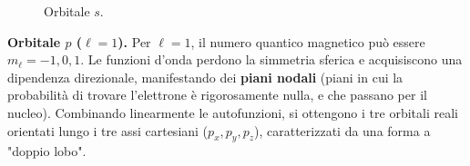 \begin{figure}[ht]
    \centering
{}
\caption{Orbitale \(s\).}
\label{fig:orbitali_s}
\end{figure}

\vspace{0.5em}
\textbf{Orbitale \(p\) (\(\ell=1\)).} Per \(\ell=1\), il numero quantico magnetico può essere \(m_\ell = -1, 0, 1\). Le funzioni d'onda perdono la simmetria sferica e acquisiscono una dipendenza direzionale, manifestando dei \textbf{piani nodali} (piani in cui la probabilità di trovare l'elettrone è rigorosamente nulla, e che passano per il nucleo). 
Combinando linearmente le autofunzioni, si ottengono i tre orbitali reali orientati lungo i tre assi cartesiani (\(p_x, p_y, p_z\)), caratterizzati da una forma a "doppio lobo".

